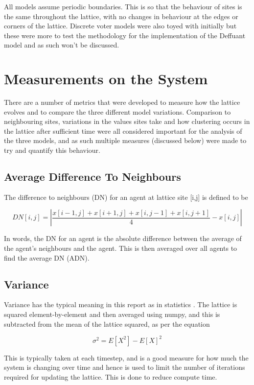 All models assume periodic boundaries. This is so that the behaviour of sites is the same throughout the lattice, with no changes in behaviour at the edges or corners of the lattice. Discrete voter models were also toyed with initially but these were more to test the methodology for the implementation of the Deffuant model and as such won't be discussed.

\section{Measurements on the System}
There are a number of metrics that were developed to measure how the lattice evolves and to compare the three different model variations. Comparison to neighbouring sites, variations in the values sites take and how clustering occurs in the lattice after sufficient time were all considered important for the analysis of the three models, and as such multiple measures (discussed below) were made to try and quantify this behaviour.

\subsection{Average Difference To Neighbours}
The difference to neighbours (DN) for an agent at lattice site [i,j] is defined to be

\begin{equation}
DN[i,j] = |\frac{x[i-1,j] + x[i+1,j] + x[i,j-1] + x[i,j+1]}{4} - x[i,j]|
\end{equation}

 In words, the DN for an agent is the absolute difference between the average of the agent's neighbours and the agent. This is then averaged over all agents to find the average DN (ADN).

 \subsection{Variance}
 Variance has the typical meaning in this report as in statistics \cite{donnelly2016statistics}. The lattice is squared element-by-element and then averaged using numpy, and this is subtracted from the mean of the lattice squared, as per the equation

 \begin{equation}
 \sigma^{2} = E[X^{2}] - E[X]^{2}
\end{equation}
 
 This is typically taken at each timestep, and is a good measure for how much the system is changing over time and hence is used to limit the number of iterations required for updating the lattice. This is done to reduce compute time.

